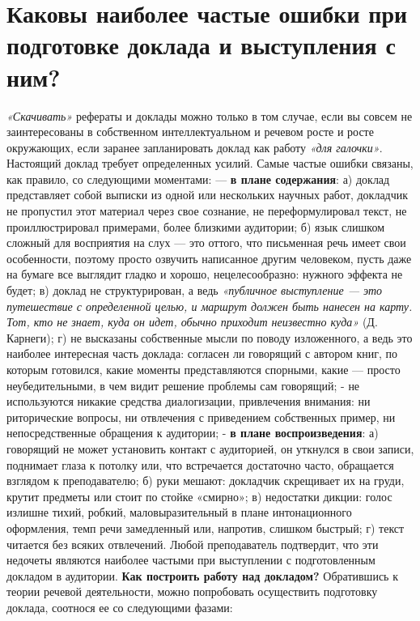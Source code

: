 {{\chapter{\textbf{Каковы наиболее частые ошибки при подготовке доклада и выступления с ним?}}
\textit{ «Скачивать»} рефераты и доклады можно только в том случае, если вы совсем не заинтересованы в собственном интеллектуальном и речевом росте и росте окружающих, если заранее запланировать доклад как работу \textit{«для галочки»}.
Настоящий доклад требует определенных усилий. Самые частые ошибки связаны, как правило, со следующими моментами:
— \textbf{в плане содержания}: а) доклад представляет собой выписки из одной или нескольких научных работ, докладчик не пропустил этот материал через свое сознание, не переформулировал текст, не проиллюстрировал примерами, более близкими аудитории; б) язык слишком сложный для восприятия на слух — это оттого, что письменная речь имеет свои особенности, поэтому просто озвучить написанное другим человеком, пусть даже на бумаге все выглядит гладко и хорошо, нецелесообразно: нужного эффекта не будет; в) доклад не структурирован, а ведь \textit{«публичное выступление — это путешествие с определенной целью, и маршрут должен быть нанесен на карту. Тот, кто не знает, куда он идет, обычно приходит неизвестно куда»} (Д. Карнеги); г) не высказаны собственные мысли по поводу изложенного, а ведь это наиболее интересная часть доклада: согласен ли говорящий с автором книг, по которым готовился, какие моменты представляются спорными, какие — просто неубедительными, в чем видит решение проблемы сам говорящий; - не используются никакие средства диалогизации, привлечения внимания: ни риторические вопросы, ни отвлечения с приведением собственных пример, ни непосредственные обращения к аудитории;
-  \textbf{в плане воспроизведения}: а) говорящий не может установить контакт с аудиторией, он уткнулся в свои записи, поднимает глаза к потолку или, что встречается достаточно часто, обращается взглядом к преподавателю; б) руки мешают: докладчик скрещивает их на груди, крутит предметы или стоит по стойке «смирно»; в) недостатки дикции: голос излишне тихий, робкий, маловыразительный в плане интонационного оформления, темп речи замедленный или, напротив, слишком быстрый; г) текст читается без всяких отвлечений. Любой преподаватель подтвердит, что эти недочеты являются наиболее частыми при выступлении с подготовленным докладом в аудитории.
 \textbf{Как построить работу над докладом?}
Обратившись к теории речевой деятельности, можно попробовать осуществить подготовку доклада, соотнося ее со следующими фазами:
}}
